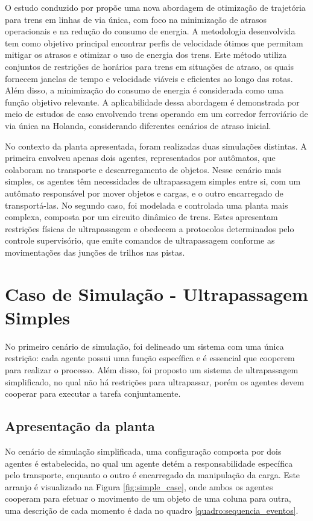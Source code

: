 O estudo conduzido por \cite{wang2017} propõe uma nova abordagem de otimização de trajetória para trens em linhas de via única, com foco na minimização de atrasos operacionais e na redução do consumo de energia. A metodologia desenvolvida tem como objetivo principal encontrar perfis de velocidade ótimos que permitam mitigar os atrasos e otimizar o uso de energia dos trens. Este método utiliza conjuntos de restrições de horários para trens em situações de atraso, os quais fornecem janelas de tempo e velocidade viáveis e eficientes ao longo das rotas. Além disso, a minimização do consumo de energia é considerada como uma função objetivo relevante. A aplicabilidade dessa abordagem é demonstrada por meio de estudos de caso envolvendo trens operando em um corredor ferroviário de via única na Holanda, considerando diferentes cenários de atraso inicial.

No contexto da planta apresentada, foram realizadas duas simulações distintas. A primeira envolveu apenas dois agentes, representados por autômatos, que colaboram no transporte e descarregamento de objetos. Nesse cenário mais simples, os agentes têm necessidades de ultrapassagem simples entre si, com um autômato responsável por mover objetos e cargas, e o outro encarregado de transportá-las. No segundo caso, foi modelada e controlada uma planta mais complexa, composta por um circuito dinâmico de trens. Estes apresentam restrições físicas de ultrapassagem e obedecem a protocolos determinados pelo controle supervisório, que emite comandos de ultrapassagem conforme as movimentações das junções de trilhos nas pistas.



\section{Caso de Simulação - Ultrapassagem Simples}
No primeiro cenário de simulação, foi delineado um sistema com uma única restrição: cada agente possui uma função específica e é essencial que cooperem para realizar o processo. Além disso, foi proposto um sistema de ultrapassagem simplificado, no qual não há restrições para ultrapassar, porém os agentes devem cooperar para executar a tarefa conjuntamente.
\subsection{Apresentação da planta}
No cenário de simulação simplificada, uma configuração composta por dois agentes é estabelecida, no qual um agente detém a responsabilidade específica pelo transporte, enquanto o outro é encarregado da manipulação da carga. Este arranjo é visualizado na Figura \ref{fig:simple_case}, onde ambos os agentes cooperam para efetuar o movimento de um objeto de uma coluna para outra, uma descrição de cada momento é dada no quadro \ref{quadro:sequencia_eventos}.

